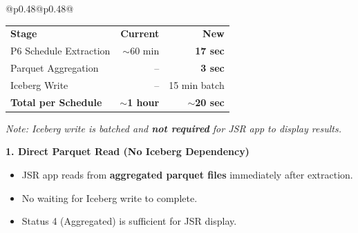 \documentclass[10pt, a4paper]{article}
\begin{document}
{\footnotesize
\begin{tabular}[t]{@{}p{}@{\hspace{0.02\textwidth}}p{}@{}}
\vspace{0pt}
\raggedright

    \begin{tikzpicture}
        \node[fill=black!80, text=white, rounded corners=3pt, inner sep=3pt, text width=\linewidth-6pt, align=left] {\textbf{Performance Comparison}};
    \end{tikzpicture}

    \vspace{0.1em}

    {\footnotesize
    \renewcommand{\arraystretch}{1.15}
    \begin{tabularx}{\linewidth}{@{}Xrr@{}}
    \rowcolor{black!10}
    \textbf{Stage} & \textbf{Current} & \textbf{New} \\
    \rowcolor{white}
    P6 Schedule Extraction & $\sim$60 min & \textbf{17 sec} \\
    \rowcolor{black!5}
    Parquet Aggregation & -- & \textbf{3 sec} \\
    \rowcolor{white}
    Iceberg Write & -- & 15 min batch \\
    \rowcolor{black!5}
    \textbf{Total per Schedule} & \textbf{$\sim$1 hour} & \textbf{$\sim$20 sec} \\
    \end{tabularx}
    \renewcommand{\arraystretch}{1.0}
    
    \vspace{0.1em}
    \textit{Note: Iceberg write is batched and \textbf{not required} for JSR app to display results.}
    }

    \vspace{0.2em}


    \vspace{0.05em}

    {\footnotesize
    \textbf{1. Direct Parquet Read (No Iceberg Dependency)}
    \begin{itemize}[leftmargin=1em, itemsep=0em]
        \item JSR app reads from \textbf{aggregated parquet files} immediately after extraction.
        \item No waiting for Iceberg write to complete.
        \item Status 4 (Aggregated) is sufficient for JSR display.
    \end{itemize}

}
\end{tabular}}
\end{document}
